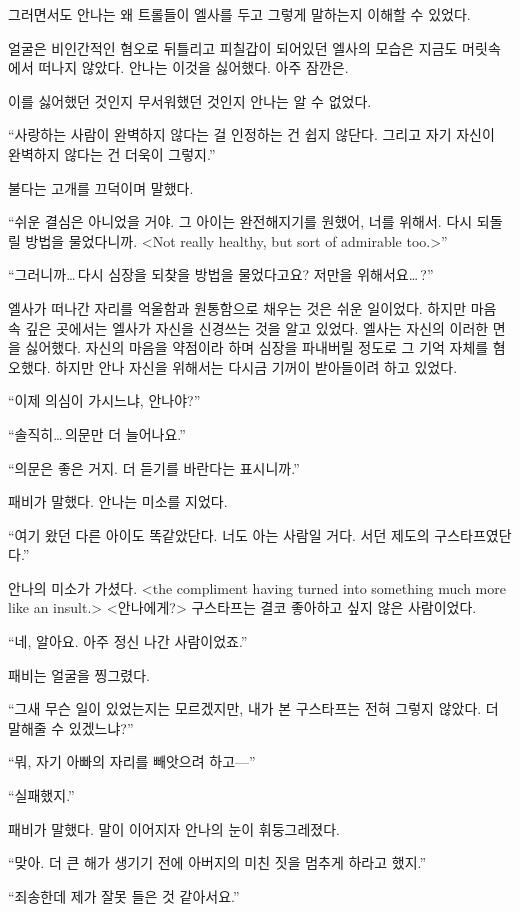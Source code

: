 그러면서도 안나는 왜 트롤들이 엘사를 두고 그렇게 말하는지 이해할 수 있었다.

얼굴은 비인간적인 혐오로 뒤틀리고 피칠갑이 되어있던 엘사의 모습은 지금도 머릿속에서 떠나지 않았다. 안나는 이것을 싫어했다. 아주 잠깐은.

이를 싫어했던 것인지 무서워했던 것인지 안나는 알 수 없었다.

``사랑하는 사람이 완벽하지 않다는 걸 인정하는 건 쉽지 않단다. 그리고 자기 자신이 완벽하지 않다는 건 더욱이 그렇지.''

불다는 고개를 끄덕이며 말했다.

``쉬운 결심은 아니었을 거야. 그 아이는 완전해지기를 원했어, 너를 위해서. 다시 되돌릴 방법을 물었다니까. <Not really healthy, but sort of admirable too.>''

``그러니까\ldots\,다시 심장을 되찾을 방법을 물었다고요? 저만을 위해서요\ldots\,?''

엘사가 떠나간 자리를 억울함과 원통함으로 채우는 것은 쉬운 일이었다. 하지만 마음 속 깊은 곳에서는 엘사가 자신을 신경쓰는 것을 알고 있었다. 엘사는 자신의 이러한 면을 싫어했다. 자신의 마음을 약점이라 하며 심장을 파내버릴 정도로 그 기억 자체를 혐오했다. 하지만 안나 자신을 위해서는 다시금 기꺼이 받아들이려 하고 있었다.

``이제 의심이 가시느냐, 안나야?''

``솔직히\ldots\,의문만 더 늘어나요.''

``의문은 좋은 거지. 더 듣기를 바란다는 표시니까.''

패비가 말했다. 안나는 미소를 지었다.

``여기 왔던 다른 아이도 똑같았단다. 너도 아는 사람일 거다. 서던 제도의 구스타프였단다.''

안나의 미소가 가셨다. <the compliment having turned into something much more like an insult.> <안나에게\append?> 구스타프는 결코 좋아하고 싶지 않은 사람이었다.

``네, 알아요. 아주 정신 나간 사람이었죠.''

패비는 얼굴을 찡그렸다.

``그새 무슨 일이 있었는지는 모르겠지만, 내가 본 구스타프는 전혀 그렇지 않았다. 더 말해줄 수 있겠느냐?''

``뭐, 자기 아빠의 자리를 빼앗으려 하고—''

``실패했지.''

패비가 말했다. 말이 이어지자 안나의 눈이 휘둥그레졌다.

``맞아. 더 큰 해가 생기기 전에 아버지의 미친 짓을 멈추게 하라고 했지.''

``죄송한데 제가 잘못 들은 것 같아서요.''

